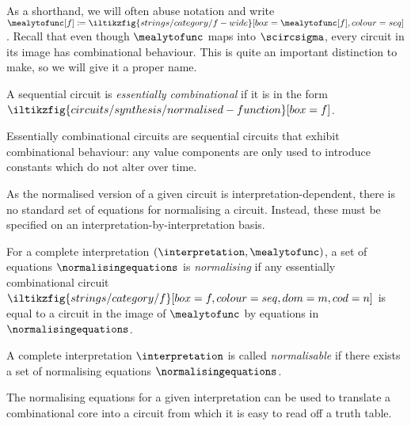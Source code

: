 As a shorthand, we will often abuse notation and write \(
\mealytofunc[f]
\coloneqq
\iltikzfig{strings/category/f-wide}[box=\mealytofunc[f],colour=seq]
\).
Recall that even though \(\mealytofunc\) maps into \(\scircsigma\), every
circuit in its image has combinational behaviour.
This is quite an important distinction to make, so we will give it a proper
name.

\begin{lemma}
    A sequential circuit is \emph{essentially combinational} if it is in the
    form \(
    \iltikzfig{circuits/synthesis/normalised-function}[box=f]
    \).
\end{lemma}

Essentially combinational circuits are sequential circuits that exhibit
combinational behaviour: any value components are only used to introduce
constants which do not alter over time.

As the normalised version of a given circuit is interpretation-dependent, there
is no standard set of equations for normalising a circuit.
Instead, these must be specified on an interpretation-by-interpretation basis.

\begin{definition}
    For a complete interpretation \((\interpretation,\mealytofunc)\), a set of
    equations \(\normalisingequations\) is \emph{normalising} if any
    essentially combinational circuit \(
    \iltikzfig{strings/category/f}[box=f,colour=seq,dom=m,cod=n]
    \) is equal to a circuit in the image of \(\mealytofunc\) by equations in
    \(\normalisingequations\).
\end{definition}

\begin{definition}
    A complete interpretation \(\interpretation\) is called \emph{normalisable} if there
    exists a set of normalising equations \(\normalisingequations\).
\end{definition}

The normalising equations for a given interpretation can be used to translate a
combinational core into a circuit from which it is easy to read off a truth
table.

